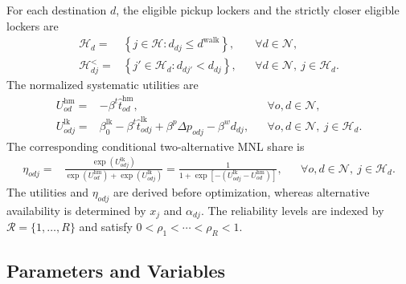 \documentclass[final,3p,authoryear]{elsarticle}
\begin{document}
For each destination $d$, the eligible pickup lockers and the strictly closer eligible lockers are
\begin{align}
\mathcal H_d
={}&
\left\{j\in\mathcal H:d_{dj}\le d^{\mathrm{walk}}\right\},
&&\forall d\in\mathcal N,
\label{app:set_choice_lockers}
\\
\mathcal H_{dj}^{<}
={}&
\left\{j'\in\mathcal H_d:d_{dj'}<d_{dj}\right\},
&&\forall d\in\mathcal N,\ j\in\mathcal H_d.
\label{app:set_closer_lockers}
\end{align}
The normalized systematic utilities are
\begin{subequations}
\label{app:choice_utilities}
\begin{align}
U_{od}^{\mathrm{hm}}
={}&
-\beta^{t}\widehat t_{od}^{\mathrm{hm}},
&&\forall o,d\in\mathcal N,
\label{app:home_utility}
\\
U_{odj}^{\mathrm{lk}}
={}&
\beta_0^{\mathrm{lk}}
-\beta^{t}\widehat t_{odj}^{\mathrm{lk}}
+\beta^{p}\Delta p_{odj}
-\beta^{w}d_{dj},
&&\forall o,d\in\mathcal N,\ j\in\mathcal H_d.
\label{app:locker_utility}
\end{align}
\end{subequations}
The corresponding conditional two-alternative MNL share is
\begin{align}
\eta_{odj}
={}&
\frac{\exp\!\left(U_{odj}^{\mathrm{lk}}\right)}
{\exp\!\left(U_{od}^{\mathrm{hm}}\right)+\exp\!\left(U_{odj}^{\mathrm{lk}}\right)}
=
\frac{1}{1+\exp\!\left[-\left(U_{odj}^{\mathrm{lk}}-U_{od}^{\mathrm{hm}}\right)\right]},
&&\forall o,d\in\mathcal N,\ j\in\mathcal H_d.
\label{app:choice_share}
\end{align}
The utilities and $\eta_{odj}$ are derived before optimization, whereas alternative availability is determined by $x_j$ and $\alpha_{dj}$.
The reliability levels are indexed by $\mathcal R=\{1,\ldots,R\}$ and satisfy $0<\rho_1<\cdots<\rho_R<1$.

\subsection{Parameters and Variables}
\end{document}
